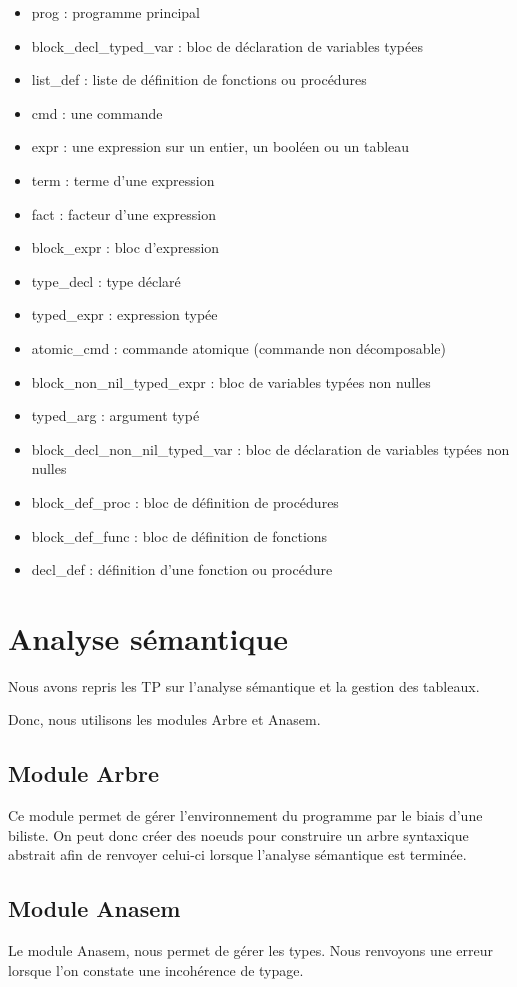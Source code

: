 \documentclass[11pt,a4paper]{article}
\begin{document}
\begin{itemize}
\item prog : programme principal
\item block\_decl\_typed\_var : bloc de déclaration de variables typées
\item list\_def : liste de définition de fonctions ou procédures
\item cmd : une commande
\item expr : une expression sur un entier, un booléen ou un tableau
\item term : terme d'une expression
\item fact : facteur d'une expression
\item block\_expr : bloc d'expression 
\item type\_decl : type déclaré
\item typed\_expr : expression typée
\item atomic\_cmd : commande atomique (commande non décomposable)
\item block\_non\_nil\_typed\_expr : bloc de variables typées non nulles
\item typed\_arg : argument typé
\item block\_decl\_non\_nil\_typed\_var : bloc de déclaration de variables typées non nulles
\item block\_def\_proc : bloc de définition de procédures
\item block\_def\_func : bloc de définition de fonctions
\item decl\_def : définition d'une fonction ou procédure
\end{itemize}

\pagebreak

\section{Analyse sémantique}
Nous avons repris les TP sur l'analyse sémantique et la gestion des tableaux.

Donc, nous utilisons les modules Arbre et Anasem.

\subsection{Module Arbre}
Ce module permet de gérer l'environnement du programme par le biais d'une biliste. On peut donc créer des noeuds pour construire un arbre syntaxique abstrait afin de renvoyer celui-ci lorsque l'analyse sémantique est terminée.
\subsection{Module Anasem}
Le module Anasem, nous permet de gérer les types. Nous renvoyons une erreur lorsque l'on constate une incohérence de typage.
\end{document}

